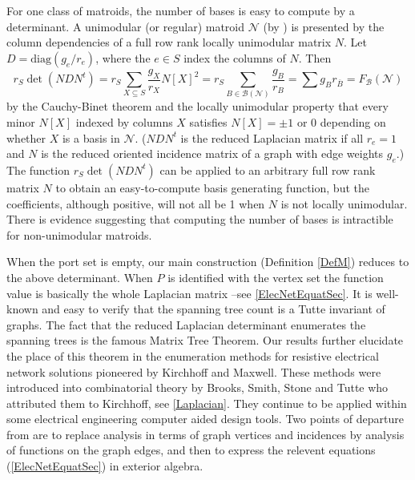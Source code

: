 \documentclass[12pt]{article}
\theoremstyle{definition}
\newcommand{\scomp}[1]{\ensuremath{\overline{#1}}}
\begin{document}
For one class of matroids, the number of bases is easy to 
compute by a determinant.
A unimodular (or regular) matroid 
$\mathcal{N}$ (by \cite[see Theorem 3.1.1]{CombinatorialGeometries}) 
is presented by
the column dependencies of a full row rank locally unimodular matrix $N$.
Let $D=\mbox{diag}(g_e/r_e)$, 
where the $e\in S$ index the columns of $N$.  Then
\begin{equation}
\label{BasisEnumPoly}
r_S\det(NDN^t) = r_S\sum_{X\subseteq S}\frac{g_X}{r_X}N[X]^2
= r_S\sum_{B\in\mathcal{B}(\mathcal{N})}\frac{g_B}{r_B}
= \sum g_B r_{\scomp{B}} = F_{\mathcal{B}}(\mathcal{N})
\end{equation}
by the Cauchy-Binet theorem and the 
locally unimodular property that every minor
$N[X]$ indexed by columns $X$ satisfies 
$N[X]=\pm 1$ or $0$ depending on whether $X$ is a basis 
in $\mathcal{N}$.   ($NDN^t$ is the reduced Laplacian 
matrix if all $r_e=1$ and $N$ is the reduced oriented incidence
matrix of a graph with edge weights $g_e$.)  The function
$r_S\det(NDN^t)$ can be applied to an arbitrary full row rank matrix $N$
to obtain an easy-to-compute basis generating function,
but the coefficients, although positive, will
not all be 1 when $N$ is not locally unimodular.  There is evidence suggesting
that computing the number of bases is intractible for non-unimodular
matroids\cite{VertiganBaseCounting}. 

When the port set is empty, our main construction 
(Definition \ref{DefM}) reduces to the
above determinant.
When $P$ is 
identified with the vertex set the function value is basically the
whole Laplacian matrix --see \textsection 
\ref{ElecNetEquatSec}.
It is well-known and easy to verify
that the spanning tree count is a Tutte invariant of graphs.  
The fact that the
reduced Laplacian determinant enumerates the spanning trees is
the famous Matrix Tree Theorem.  Our results 
further elucidate the place of this theorem in the enumeration methods
for resistive electrical network solutions
pioneered by Kirchhoff\cite{Kirchhoff} and 
Maxwell\cite{MaxwellsFramesPaper}.  
These methods were introduced into combinatorial theory
by Brooks, Smith, Stone and Tutte\cite{BSST,TutteBook} who attributed
them to Kirchhoff, see \textsection \ref{Laplacian}.  
They continue to be applied
within some electrical engineering computer aided
design tools\cite{someEEBooks}.
Two points of departure from \cite{BSST} are to 
replace analysis in terms of graph vertices and incidences
by analysis
of functions on the graph edges, and then to
express the relevent equations 
(\textsection \ref{ElecNetEquatSec}) in exterior algebra.
\end{document}
